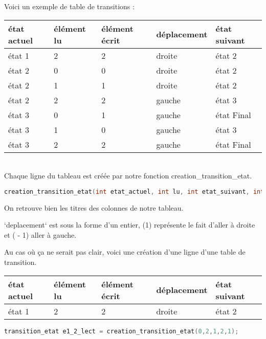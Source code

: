 \documentclass[a4paper,10pt]{article}
\begin{document}
        Voici un exemple de table de transitions : 
        \\[1 em]
        \begin{tabular}{|l|l|l|l|l|}
          \hline
          état actuel & élément lu & élément  écrit & déplacement & état suivant\\
          \hline
          état 1 & 2 & 2 & droite & état 2 \\   
          \hline 
          état 2 & 0 & 0 & droite &  état 2 \\
          état 2 & 1 & 1 & droite &  état 2 \\
          état 2 & 2 & 2 & gauche &  état 3 \\
          \hline
          état 3 & 0 & 1 & gauche & état Final \\   
          état 3 & 1 & 0 & gauche & état 3 \\  
          état 3 & 2 & 2 & gauche & état Final \\
          \hline
        \end{tabular}
        \\[1 em] 
        
        Chaque ligne du tableau est créée par notre fonction creation\_transition\_etat. 
        
        \begin{lstlisting}[language=c]
        creation_transition_etat(int etat_actuel, int lu, int etat_suivant, int ecrit, int deplacement )
        \end{lstlisting}
        
        On retrouve bien les titres des colonnes de notre tableau.
        
        `deplacement` est sous la forme d'un entier, (1) représente le fait d'aller à droite et ( - 1) aller à gauche.
        
        Au cas où ça ne serait pas clair, voici une création d'une ligne d'une table de transition.
        \\[1 em] 
        
        \begin{tabular}{|l|l|l|l|l|}
          \hline
          état actuel & élément lu & élément  écrit & déplacement & état suivant\\
          \hline
          état 1 & 2 & 2 & droite & état 2  \\
          \hline
        \end{tabular}
        
        \begin{lstlisting}[language=c]
        transition_etat e1_2_lect = creation_transition_etat(0,2,1,2,1);
        \end{lstlisting}
        
\end{document}
